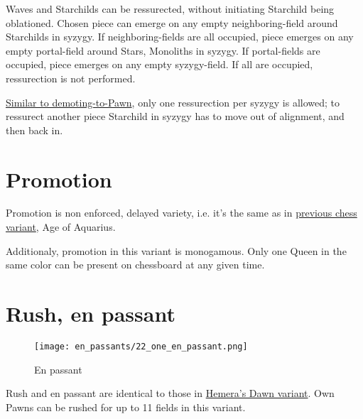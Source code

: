 Waves and Starchilds can be ressurected, without initiating Starchild being oblationed. Chosen piece can emerge
on any empty neighboring-field around Starchilds in syzygy. If neighboring-fields are all occupied, piece emerges
on any empty portal-field around Stars, Monoliths in syzygy. If portal-fields are occupied, piece emerges on any
empty syzygy-field. If all are occupied, ressurection is not performed.

\clearpage %

\hyperref[fig:scn_d_16_syzygy_2_stars_steps]{Similar to demoting-to-Pawn}, only one ressurection per syzygy is
allowed; to ressurect another piece Starchild in syzygy has to move out of alignment, and then back in.

\section*{Promotion}
\label{sec:One/Promotion}

Promotion is non enforced, delayed variety, i.e. it's the same as in
\hyperref[sec:Age of Aquarius/Promotion]{previous chess variant}, Age of Aquarius.

Additionaly, promotion in this variant is monogamous.
Only one Queen in the same color can be present on chessboard at any given time.

\clearpage %

\section*{Rush, en passant}

\vspace*{-1.2\baselineskip}
\noindent
\begin{figure}[!h]
\texttt{[image: en\_passants/22\_one\_en\_passant.png]}
\caption{En passant}
\label{fig:22_one_en_passant}
\end{figure}

Rush and en passant are identical to those in \hyperref[fig:14_hemera_s_dawn_en_passant]{Hemera's Dawn variant}.
Own Pawns can be rushed for up to 11 fields in this variant.

